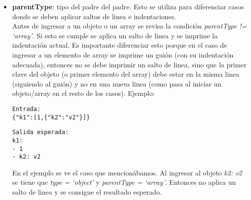 \begin{itemize}
    \item \textbf{parentType}: tipo del padre del padre. Esto se utiliza para diferenciar casos donde se deben aplicar saltos de linea e indentaciones. \\
    Antes de ingresar a un objeto o un array se revisa la condición \textit{parentType != `array'}. Si esto se cumple se aplica un salto de linea y se imprime la indentación actual. Es importante diferenciar esto porque en el caso de ingresar a un elemento de array se imprime un guión (con su indentación adecuada), entonces no se debe imprimir un salto de linea, sino que la primer clave del objeto (o primer elemento del array) debe estar en la misma linea (siguiendo al guión) y no en una nueva linea (como pasa al iniciar un objeto/array en el resto de los casos).
    Ejemplo:
    \begin{verbatim}
Entrada:
{"k1":[1,{"k2":"v2"}]}
    \end{verbatim}
    \begin{verbatim}
Salida esperada:
k1:
- 1
- k2: v2
    \end{verbatim}
    En el ejemplo se ve el caso que mencionábamos. Al ingresar al objeto \textit{{k2: v2}} se tiene que \textit{type = `object'} y \textit{parentType = `array'}. Entonces no aplica un salto de linea y se consigue el resultado esperado.


\end{itemize}
